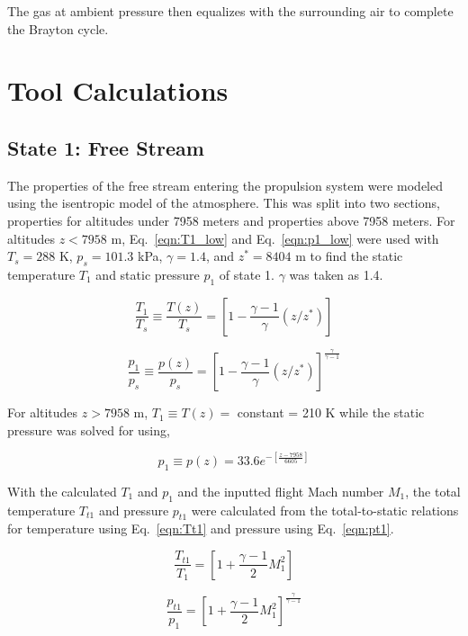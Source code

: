 \documentclass[conf]{new-aiaa} %
\begin{document}
The gas at ambient pressure then equalizes with the surrounding air to complete the Brayton cycle.


\section{Tool Calculations} \label{sec:tool_calculations}
\subsection{State 1: Free Stream}
The properties of the free stream entering the propulsion system were modeled using the isentropic model of the atmosphere. This was split into two sections, properties for altitudes under 7958 meters and properties above 7958 meters. For altitudes $z<7958$ m, Eq.~\eqref{eqn:T1_low} and Eq.~\eqref{eqn:p1_low} were used with $T_s=288$ K, $p_s=101.3$ kPa, $\gamma=1.4$, and $z^*=8404$ m to find the static temperature $T_1$ and static pressure $p_1$ of state 1. $\gamma$ was taken as 1.4.

\begin{equation}
    \label{eqn:T1_low}
    \frac{T_1}{T_s}\equiv\frac{T(z)}{T_s}=\left[1-\frac{\gamma-1}{\gamma}(z/z^*)\right]
\end{equation}

\begin{equation}
    \label{eqn:p1_low}
    \frac{p_1}{p_s}\equiv\frac{p(z)}{p_s}=\left[1-\frac{\gamma-1}{\gamma}(z/z^*)\right]^\frac{\gamma}{\gamma-1}
\end{equation}

For altitudes $z>7958$ m, $T_1\equiv T(z)=$ constant = 210 K while the static pressure was solved for using,

\begin{equation}
    \label{eqn:p1_high}
    p_1\equiv p(z)=33.6e^{-\left[\frac{z-7958}{6605}\right]}
\end{equation}

With the calculated $T_1$ and $p_1$ and the inputted flight Mach number $M_1$, the total temperature $T_{t1}$ and pressure $p_{t1}$ were calculated from the total-to-static relations for temperature using Eq.~\eqref{eqn:Tt1} and pressure using Eq.~\eqref{eqn:pt1}.

\begin{equation}
    \label{eqn:Tt1}
    \frac{T_{t1}}{T_1}=\left[1+\frac{\gamma-1}{2}M_1^2\right]
\end{equation}

\begin{equation}
    \label{eqn:pt1}
    \frac{p_{t1}}{p_1}=\left[1+\frac{\gamma-1}{2}M_1^2\right]^\frac{\gamma}{\gamma-1}
\end{equation}
\end{document}

